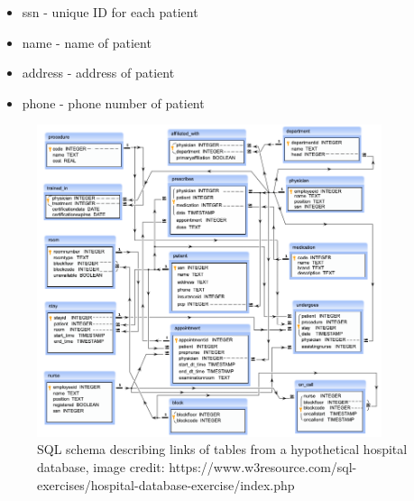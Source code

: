\documentclass[
  letterpaper,
  DIV=11,
  numbers=noendperiod]{scrartcl}
\providecommand{\tightlist}{%
  \setlength{\itemsep}{0pt}\setlength{\parskip}{0pt}}\usepackage{longtable,booktabs,array}
\begin{document}
\begin{itemize}
  \begin{itemize}
  \tightlist
  \item
    ssn - unique ID for each patient
  \item
    name - name of patient
  \item
    address - address of patient
  \item
    phone - phone number of patient
  \end{itemize}
\end{itemize}

\begin{figure}

{\centering \includegraphics[width=0.9\textwidth,height=\textheight]{../images/hospital-database.png}

}

\caption{\label{fig-hosp-db}SQL schema describing links of tables from a
hypothetical hospital database, image credit:
https://www.w3resource.com/sql-exercises/hospital-database-exercise/index.php}

\end{figure}
\end{document}
